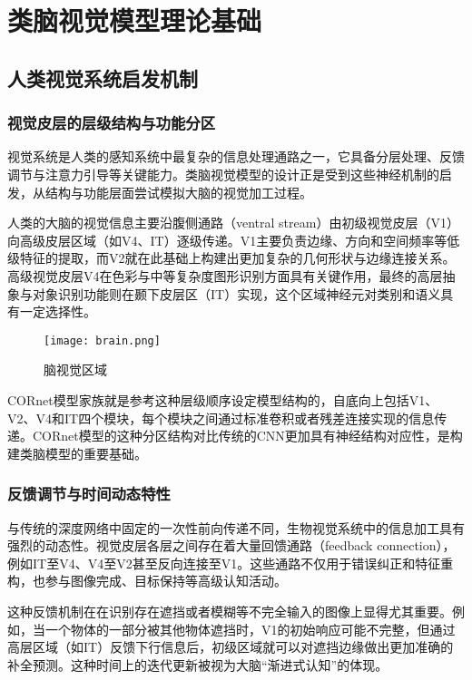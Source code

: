 \chapter{类脑视觉模型理论基础}

\section{人类视觉系统启发机制}

\subsection{视觉皮层的层级结构与功能分区}

视觉系统是人类的感知系统中最复杂的信息处理通路之一，它具备分层处理、反馈调节与注意力引导等关键能力。类脑视觉模型的设计正是受到这些神经机制的启发，从结构与功能层面尝试模拟大脑的视觉加工过程。

人类的大脑的视觉信息主要沿腹侧通路（ventral stream）由初级视觉皮层（V1）向高级皮层区域（如V4、IT）逐级传递。V1主要负责边缘、方向和空间频率等低级特征的提取，而V2就在此基础上构建出更加复杂的几何形状与边缘连接关系。高级视觉皮层V4在色彩与中等复杂度图形识别方面具有关键作用，最终的高层抽象与对象识别功能则在颞下皮层区（IT）实现，这个区域神经元对类别和语义具有一定选择性。

\begin{figure}[hbt]
	\centering
	\texttt{[image: brain.png]}
	\caption{脑视觉区域}
	\label{f.example}
\end{figure}

CORnet模型家族就是参考这种层级顺序设定模型结构的，自底向上包括V1、V2、V4和IT四个模块，每个模块之间通过标准卷积或者残差连接实现的信息传递。CORnet模型的这种分区结构对比传统的CNN更加具有神经结构对应性，是构建类脑模型的重要基础。

\subsection{反馈调节与时间动态特性}

与传统的深度网络中固定的一次性前向传递不同，生物视觉系统中的信息加工具有强烈的动态性。视觉皮层各层之间存在着大量回馈通路（feedback connection），例如IT至V4、V4至V2甚至反向连接至V1。这些通路不仅用于错误纠正和特征重构，也参与图像完成、目标保持等高级认知活动。

这种反馈机制在在识别存在遮挡或者模糊等不完全输入的图像上显得尤其重要。例如，当一个物体的一部分被其他物体遮挡时，V1的初始响应可能不完整，但通过高层区域（如IT）反馈下行信息后，初级区域就可以对遮挡边缘做出更加准确的补全预测。这种时间上的迭代更新被视为大脑“渐进式认知”的体现。


